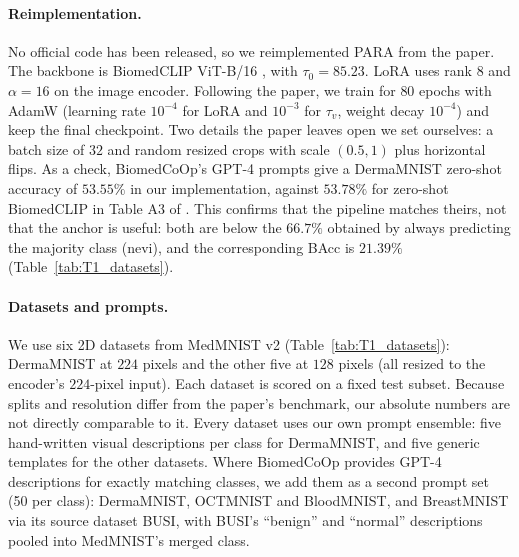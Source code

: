 \paragraph{Reimplementation.}
No official code has been released, so we reimplemented PARA from the paper.
The backbone is BiomedCLIP ViT-B/16 \citep{zhang2023biomedclip}, with $\tau_0 = 85.23$.
LoRA uses rank $8$ and $\alpha = 16$ on the image encoder.
Following the paper, we train for $80$ epochs with AdamW (learning rate $10^{-4}$ for LoRA and $10^{-3}$ for $\tau_v$, weight decay $10^{-4}$)
and keep the final checkpoint.
Two details the paper leaves open we set ourselves: a batch size of $32$ and random resized crops with scale $(0.5, 1)$ plus horizontal flips.
As a check, BiomedCoOp's GPT-4 prompts give a DermaMNIST zero-shot accuracy of $53.55\%$ in our implementation,
against $53.78\%$ for zero-shot BiomedCLIP in Table A3 of \citet{kang2026para}.
This confirms that the pipeline matches theirs, not that the anchor is useful: both are below the $66.7\%$ obtained by always predicting
the majority class (nevi), and the corresponding BAcc is $21.39\%$ (Table~\ref{tab:T1_datasets}).

\paragraph{Datasets and prompts.}
We use six 2D datasets from MedMNIST v2 \citep{yang2023medmnist} (Table~\ref{tab:T1_datasets}):
DermaMNIST at $224$ pixels and the other five at $128$ pixels (all resized to the encoder's $224$-pixel input).
Each dataset is scored on a fixed test subset.
Because splits and resolution differ from the paper's benchmark, our absolute numbers are not directly comparable to it.
Every dataset uses our own prompt ensemble:
five hand-written visual descriptions per class for DermaMNIST, and five generic templates for the other datasets.
Where BiomedCoOp \citep{koleilat2025biomedcoop} provides GPT-4 descriptions for exactly matching classes,
we add them as a second prompt set (50 per class): DermaMNIST, OCTMNIST and BloodMNIST,
and BreastMNIST via its source dataset BUSI, with BUSI's ``benign'' and ``normal'' descriptions pooled into MedMNIST's merged class.



